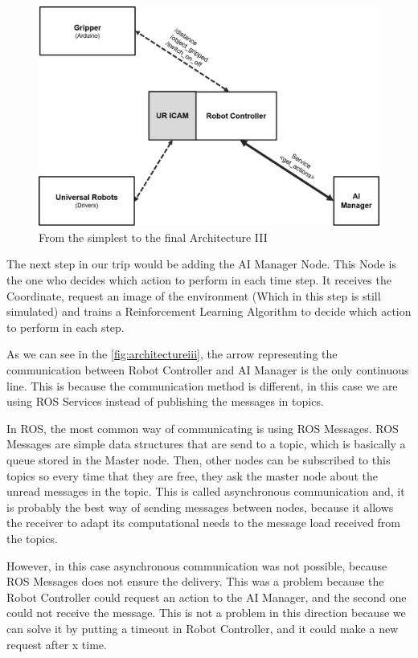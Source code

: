 		\begin{figure}[H]
			\centering
			\includegraphics[width=0.7\linewidth]{Images/ArchitectureIII}
			\caption[Architecture III]{From the simplest to the final Architecture III}
			\label{fig:architectureiii}
		\end{figure}
	
		The next step in our trip would be adding the AI Manager Node. This Node is the one who decides which action to perform in each time step. It receives the Coordinate, request an image of the environment (Which in this step is still simulated) and trains a Reinforcement Learning Algorithm to decide which action to perform in each step.		
		
		As we can see in the \autoref{fig:architectureiii}, the arrow representing the communication between Robot Controller and AI Manager is the only continuous line. This is because the communication method is different, in this case we are using ROS Services instead of publishing the messages in topics.
		
		In ROS, the most common way of communicating is using ROS Messages. ROS Messages are simple data structures that are send to a topic, which is basically a queue stored in the Master node. Then, other nodes can be subscribed to this topics so every time that they are free, they ask the master node about the unread messages in the topic. This is called asynchronous communication and, it is probably the best way of sending messages between nodes, because it allows the receiver to adapt its computational needs to the message load received from the topics.
		
		However, in this case asynchronous communication was not possible, because ROS Messages does not ensure the delivery. This was a problem because the Robot Controller could request an action to the AI Manager, and the second one could not receive the message. This is not a problem in this direction because we can solve it by putting a timeout in Robot Controller, and it could make a new request after x time. 
		
